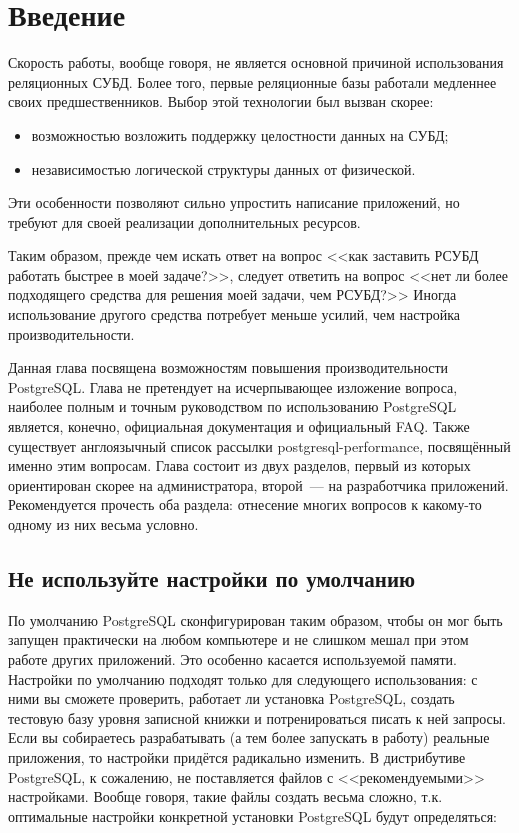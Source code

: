 \section{Введение}
Скорость работы, вообще говоря, не является основной причиной использования реляционных СУБД. Более того, первые реляционные базы работали медленнее своих предшественников.
Выбор этой технологии был вызван скорее:

\begin{itemize}
  \item возможностью возложить поддержку целостности данных на СУБД;
  \item независимостью логической структуры данных от физической.
\end{itemize}

Эти особенности позволяют сильно упростить написание приложений, но требуют для своей реализации дополнительных ресурсов.

Таким образом, прежде чем искать ответ на вопрос <<как заставить РСУБД работать быстрее в моей задаче?>>, следует ответить на вопрос <<нет ли более подходящего средства для решения моей задачи, чем РСУБД?>> Иногда использование другого средства потребует меньше усилий, чем настройка производительности.

Данная глава посвящена возможностям повышения производительности PostgreSQL. Глава не претендует на исчерпывающее изложение вопроса, наиболее полным и точным руководством по использованию PostgreSQL является, конечно, официальная документация и официальный FAQ. Также существует англоязычный список рассылки postgresql-performance, посвящённый именно этим вопросам. Глава состоит из двух разделов, первый из которых ориентирован скорее на администратора, второй~--- на разработчика приложений. Рекомендуется прочесть оба раздела: отнесение многих вопросов к какому-то одному из них весьма условно.


\subsection{Не используйте настройки по умолчанию}

По умолчанию PostgreSQL сконфигурирован таким образом, чтобы он мог быть запущен практически на любом компьютере и не слишком мешал при этом работе других приложений. Это особенно касается используемой памяти. Настройки по умолчанию подходят только для следующего использования: с ними вы сможете проверить, работает ли установка PostgreSQL, создать тестовую базу уровня записной книжки и потренироваться писать к ней запросы. Если вы собираетесь разрабатывать (а тем более запускать в работу) реальные приложения, то настройки придётся радикально изменить. В дистрибутиве PostgreSQL, к сожалению, не поставляется файлов с <<рекомендуемыми>> настройками. Вообще говоря, такие файлы создать весьма сложно, т.к. оптимальные настройки конкретной установки PostgreSQL будут определяться:

